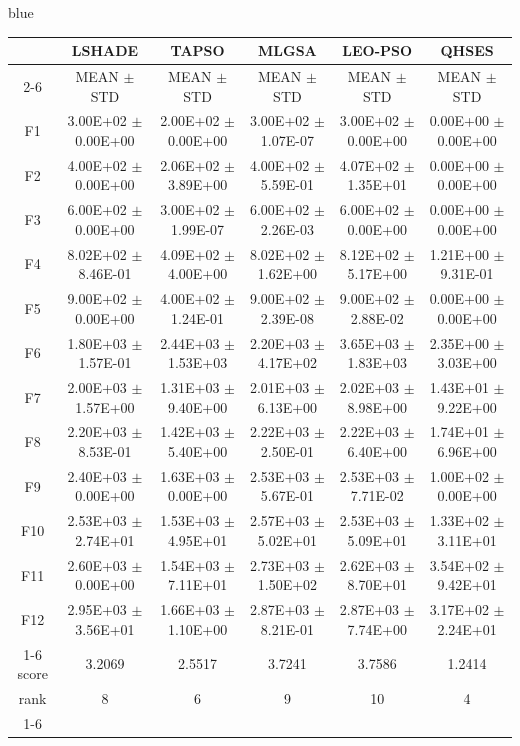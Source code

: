 \documentclass[journal, onecolumn]{IEEEtran}
\begin{document}
\begin{color}{blue}
\begin{table}[htbp!]
\begin{tabular}{c|ccccc}
			&	LSHADE				 &	TAPSO				 &	MLGSA				 &	LEO-PSO				 &	QHSES			\\\cline{2-6}	
			&	MEAN	$\pm$	STD		 &	MEAN	$\pm$	STD		 &	MEAN	$\pm$	STD		 &	MEAN	$\pm$	STD		 &	MEAN	$\pm$	STD	\\\hline
			F1	 &	3.00E+02	$\pm$	0.00E+00		 &	2.00E+02	$\pm$	0.00E+00		 &	3.00E+02	$\pm$	1.07E-07		 &	3.00E+02	$\pm$	0.00E+00		 &	0.00E+00	$\pm$	0.00E+00	\\
			F2	 &	4.00E+02	$\pm$	0.00E+00		 &	2.06E+02	$\pm$	3.89E+00		 &	4.00E+02	$\pm$	5.59E-01		 &	4.07E+02	$\pm$	1.35E+01		 &	0.00E+00	$\pm$	0.00E+00	\\
			F3	 &	6.00E+02	$\pm$	0.00E+00		 &	3.00E+02	$\pm$	1.99E-07		 &	6.00E+02	$\pm$	2.26E-03		 &	6.00E+02	$\pm$	0.00E+00		 &	0.00E+00	$\pm$	0.00E+00	\\
			F4	 &	8.02E+02	$\pm$	8.46E-01		 &	4.09E+02	$\pm$	4.00E+00		 &	8.02E+02	$\pm$	1.62E+00		 &	8.12E+02	$\pm$	5.17E+00		 &	1.21E+00	$\pm$	9.31E-01	\\
			F5	 &	9.00E+02	$\pm$	0.00E+00		 &	4.00E+02	$\pm$	1.24E-01		 &	9.00E+02	$\pm$	2.39E-08		 &	9.00E+02	$\pm$	2.88E-02		 &	0.00E+00	$\pm$	0.00E+00	\\
			F6	 &	1.80E+03	$\pm$	1.57E-01		 &	2.44E+03	$\pm$	1.53E+03		 &	2.20E+03	$\pm$	4.17E+02		 &	3.65E+03	$\pm$	1.83E+03		 &	2.35E+00	$\pm$	3.03E+00	\\
			F7	 &	2.00E+03	$\pm$	1.57E+00		 &	1.31E+03	$\pm$	9.40E+00		 &	2.01E+03	$\pm$	6.13E+00		 &	2.02E+03	$\pm$	8.98E+00		 &	1.43E+01	$\pm$	9.22E+00	\\
			F8	 &	2.20E+03	$\pm$	8.53E-01		 &	1.42E+03	$\pm$	5.40E+00		 &	2.22E+03	$\pm$	2.50E-01		 &	2.22E+03	$\pm$	6.40E+00		 &	1.74E+01	$\pm$	6.96E+00	\\
			F9	 &	2.40E+03	$\pm$	0.00E+00		 &	1.63E+03	$\pm$	0.00E+00		 &	2.53E+03	$\pm$	5.67E-01		 &	2.53E+03	$\pm$	7.71E-02		 &	1.00E+02	$\pm$	0.00E+00	\\
			F10	 &	2.53E+03	$\pm$	2.74E+01		 &	1.53E+03	$\pm$	4.95E+01		 &	2.57E+03	$\pm$	5.02E+01		 &	2.53E+03	$\pm$	5.09E+01		 &	1.33E+02	$\pm$	3.11E+01	\\
			F11	 &	2.60E+03	$\pm$	0.00E+00		 &	1.54E+03	$\pm$	7.11E+01		 &	2.73E+03	$\pm$	1.50E+02		 &	2.62E+03	$\pm$	8.70E+01		 &	3.54E+02	$\pm$	9.42E+01	\\
			F12	 &	2.95E+03	$\pm$	3.56E+01		 &	1.66E+03	$\pm$	1.10E+00		 &	2.87E+03	$\pm$	8.21E-01		 &	2.87E+03	$\pm$	7.74E+00		 &	3.17E+02	$\pm$	2.24E+01	\\ \cline{1-6}	
			score	 	& 3.2069 & 2.5517 & 3.7241 & 3.7586 &  1.2414											\\												
			rank 		& 8 & 6 & 9 & 10 & 4											\\	\cline{1-6}																					
			

\end{tabular}
\end{table}
\end{color}
\end{document}

